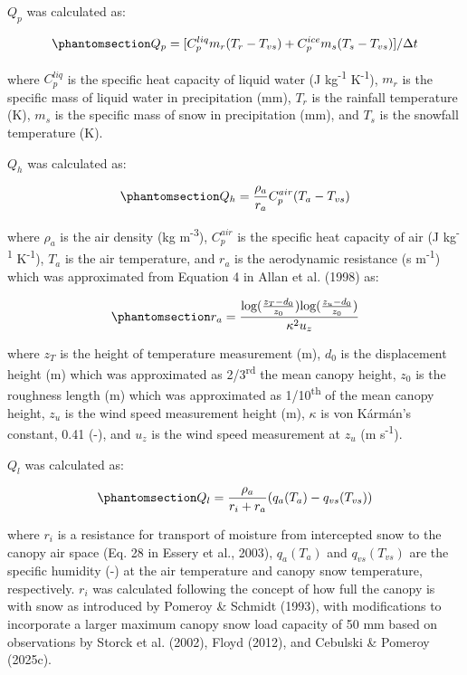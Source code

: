 \documentclass[
]{agujournal2019}
\begin{document}
\(Q_p\) was calculated as:

\begin{equation}\phantomsection\label{eq-qp}{
Q_p = [C_p^{liq} m_r(T_r - T_{vs}) + C_p^{ice} m_s(T_s - T_{vs})] / \Delta t
}\end{equation}

where \(C_p^{liq}\) is the specific heat capacity of liquid water (J
kg\textsuperscript{-1} K\textsuperscript{-1}), \(m_r\) is the specific
mass of liquid water in precipitation (mm), \(T_r\) is the rainfall
temperature (K), \(m_s\) is the specific mass of snow in precipitation
(mm), and \(T_s\) is the snowfall temperature (K).

\(Q_h\) was calculated as:

\begin{equation}\phantomsection\label{eq-qh}{
Q_h = \frac{\rho_a}{r_a} C_p^{air} (T_a - T_{vs})
}\end{equation}

where \(\rho_a\) is the air density (kg m\textsuperscript{-3}),
\(C_p^{air}\) is the specific heat capacity of air (J
kg\textsuperscript{-1} K\textsuperscript{-1}), \(T_a\) is the air
temperature, and \(r_a\) is the aerodynamic resistance (s
m\textsuperscript{-1}) which was approximated from Equation 4 in Allan
et al. (1998) as:

\begin{equation}\phantomsection\label{eq-ra}{
r_a = \frac{\text{log}(\frac{z_T - d_0}{z_0})\text{log}(\frac{z_u - d_0}{z_0})}{\kappa^2 u_z}
}\end{equation}

where \(z_T\) is the height of temperature measurement (m), \(d_0\) is
the displacement height (m) which was approximated as
2/3\textsuperscript{rd} the mean canopy height, \(z_0\) is the roughness
length (m) which was approximated as 1/10\textsuperscript{th} of the
mean canopy height, \(z_u\) is the wind speed measurement height (m),
\(\kappa\) is von Kármán's constant, 0.41 (-), and \(u_z\) is the wind
speed measurement at \(z_u\) (m s\textsuperscript{-1}).

\(Q_l\) was calculated as:

\begin{equation}\phantomsection\label{eq-ql}{
Q_l = \frac{\rho_a}{r_i+r_a} (q_a(T_a) - q_{vs}(T_{vs}))
}\end{equation}

where \(r_i\) is a resistance for transport of moisture from intercepted
snow to the canopy air space (Eq. 28 in Essery et al., 2003),
\(q_a(T_a)\) and \(q_{vs}(T_{vs})\) are the specific humidity (-) at the
air temperature and canopy snow temperature, respectively. \(r_i\) was
calculated following the concept of how full the canopy is with snow as
introduced by Pomeroy \& Schmidt (1993), with modifications to
incorporate a larger maximum canopy snow load capacity of 50 mm based on
observations by Storck et al. (2002), Floyd (2012), and Cebulski \&
Pomeroy (2025c).
\end{document}
